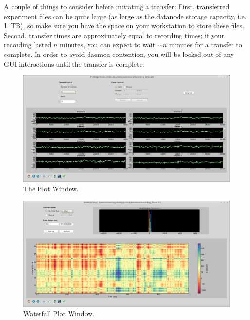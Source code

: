 A couple of things to consider before initiating a transfer: First, transferred experiment files can be quite large (as large as the datanode storage capacity, i.e. 1~TB), so make sure you have the space on your workstation to store these files. Second, transfer times are approximately equal to recording times; if your recording lasted $n$ minutes, you can expect to wait $\sim n$ minutes for a transfer to complete. In order to avoid daemon contention, you will be locked out of any GUI interactions until the transfer is complete.

\begin{figure}[h!]
\begin{center}
\includegraphics[width=17cm]{screenshots/plotwindow.png}
\end{center}
\caption{The Plot Window.}
\label{fig_plotwindow}
\end{figure}

\begin{figure}[h!]
\begin{center}
\includegraphics[width=17cm]{screenshots/waterfall.png}
\end{center}
\caption{Waterfall Plot Window.}
\label{fig_waterfall}
\end{figure}

